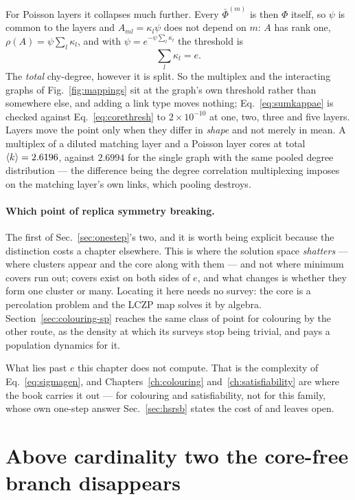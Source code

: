 For Poisson layers it collapses much further. Every $\bar\Phi^{(m)}$ is then
$\Phi$ itself, so $\psi$ is common to the layers and $A_{ml}=\kappa_{l}\psi$
does not depend on $m$: $A$ has rank one, $\rho(A)=\psi\sum_{l}\kappa_{l}$, and
with $\psi=e^{-\psi\sum_{l}\kappa_{l}}$ the threshold is
\begin{equation}
  \sum_{l}\kappa_{l}=e.
  \label{eq:sumkappae}
\end{equation}
The \emph{total} chy-degree, however it is split. So the multiplex and the
interacting graphs of Fig.~\ref{fig:mappings} sit at the graph's own threshold
rather than somewhere else, and adding a link type moves nothing;
Eq.~\eqref{eq:sumkappae} is checked against Eq.~\eqref{eq:corethresh} to
$2\times10^{-10}$ at one, two, three and five layers. Layers move the point only
when they differ in \emph{shape} and not merely in mean. A multiplex of a
diluted matching layer and a Poisson layer cores at total $\langle k \rangle=2.6196$,
against $2.6994$ for the single graph with the same pooled degree distribution
--- the difference being the degree correlation multiplexing imposes on the
matching layer's own links, which pooling destroys.

\paragraph{Which point of replica symmetry breaking.} The first of
Sec.~\ref{sec:onestep}'s two, and it is worth being explicit because the
distinction costs a chapter elsewhere. This is where the solution space
\emph{shatters} --- where clusters appear and the core along with them --- and
not where minimum covers run out; covers exist on both sides of $e$, and what
changes is whether they form one cluster or many. Locating it here needs no
survey: the core is a percolation problem and the LCZP map solves it by
algebra. Section~\ref{sec:colouring-sp} reaches the same class of point for
colouring by the other route, as the density at which its surveys stop being
trivial, and pays a population dynamics for it.

What lies past $e$ this chapter does not compute. That is the complexity of
Eq.~\eqref{eq:sigmagen}, and Chapters~\ref{ch:colouring}
and~\ref{ch:satisfiability} are where the book carries it out --- for colouring
and satisfiability, not for this family, whose own one-step answer
Sec.~\ref{sec:hsrsb} states the cost of and leaves open.

\section{Above cardinality two the core-free branch disappears}
\label{sec:corefree}

